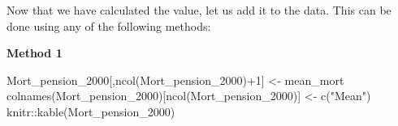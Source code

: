 \documentclass[
]{book}
\newenvironment{Shaded}{\begin{snugshade}}{\end{snugshade}}
\newcommand{\DecValTok}[1]{\textcolor[rgb]{0.00,0.00,0.81}{#1}}
\newcommand{\FunctionTok}[1]{\textcolor[rgb]{0.00,0.00,0.00}{#1}}
\newcommand{\NormalTok}[1]{#1}
\newcommand{\OtherTok}[1]{\textcolor[rgb]{0.56,0.35,0.01}{#1}}
\newcommand{\SpecialCharTok}[1]{\textcolor[rgb]{0.00,0.00,0.00}{#1}}
\newcommand{\StringTok}[1]{\textcolor[rgb]{0.31,0.60,0.02}{#1}}
\theoremstyle{definition}
\theoremstyle{definition}
\theoremstyle{definition}
\theoremstyle{definition}
\theoremstyle{remark}
\begin{document}
Now that we have calculated the value, let us add it to the data. This can be done using any of the following methods:

\textbf{Method 1}

\begin{Shaded}
\begin{Highlighting}[]
\NormalTok{Mort\_pension\_2000[,}\FunctionTok{ncol}\NormalTok{(Mort\_pension\_2000)}\SpecialCharTok{+}\DecValTok{1}\NormalTok{] }\OtherTok{\textless{}{-}}\NormalTok{ mean\_mort}
\FunctionTok{colnames}\NormalTok{(Mort\_pension\_2000)[}\FunctionTok{ncol}\NormalTok{(Mort\_pension\_2000)] }\OtherTok{\textless{}{-}} \FunctionTok{c}\NormalTok{(}\StringTok{"Mean"}\NormalTok{)}
\NormalTok{knitr}\SpecialCharTok{::}\FunctionTok{kable}\NormalTok{(Mort\_pension\_2000)}
\end{Highlighting}
\end{Shaded}
\end{document}
